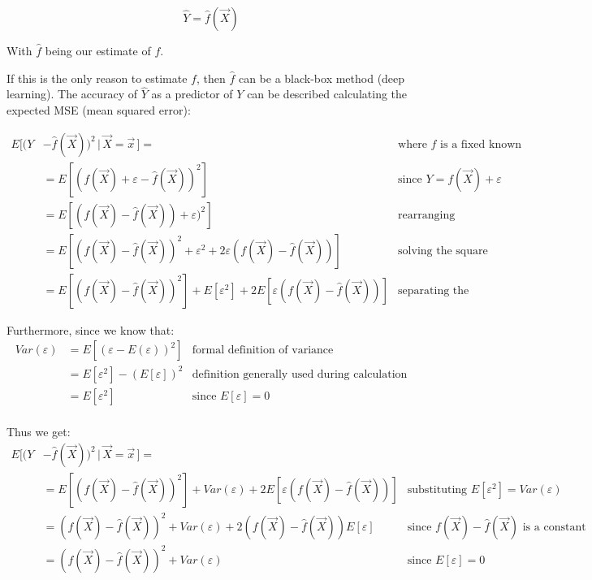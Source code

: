       $$\hat{Y} = \hat{f} (\vec{X})$$

      With $\hat{f}$ being our estimate of $f$.
      
      If this is the only reason to estimate $f$, then $\hat{f}$ can be a black-box method (deep learning).
      The accuracy of $\hat{Y}$ as a predictor of $Y$ can be described calculating the expected MSE (mean squared error):

      \begin{align*}
        E[(Y&-\hat{f}(\vec{X}))^2 \,|\, \vec{X} = \vec{x}\,] = 
        & \text{where } \hat{f} \text{ is a fixed known function}\\
        & = E[(f(\vec{X}) + \varepsilon - \hat{f}(\vec{X}))^2]
        & \text{since } Y = f(\vec{X}) + \varepsilon \\
        & = E[(f(\vec{X}) - \hat{f}(\vec{X})) + \varepsilon)^2]
        & \text{rearranging} \\
        & = E[(f(\vec{X}) - \hat{f}(\vec{X}))^2 + \varepsilon^2 + 2\varepsilon(f(\vec{X}) - \hat{f}(\vec{X}))]
        & \text{solving the square} \\
        & = E[(f(\vec{X}) - \hat{f}(\vec{X}))^2] + E[\varepsilon^2] + 2E[\varepsilon(f(\vec{X}) - \hat{f}(\vec{X}))]
        & \text{separating the expectations}
      \end{align*}
      
      Furthermore, since we know that:
      \begin{align*}
        Var(\varepsilon) 
        & = E[(\varepsilon - E(\varepsilon))^2]
        & \text{formal definition of variance} \\
        & = E[\varepsilon^2] - (E[\varepsilon])^2  
        & \text{definition generally used during calculation} \\
        & = E[\varepsilon^2] 
        & \text{since } E[\varepsilon] = 0 \\
      \end{align*}

      Thus we get:
      \begin{align*}
        E[(Y&-\hat{f}(\vec{X}))^2 \,|\, \vec{X} = \vec{x}\,] = \\
        & = E[(f(\vec{X}) - \hat{f}(\vec{X}))^2] + Var(\varepsilon) + 2E[\varepsilon(f(\vec{X}) - \hat{f}(\vec{X}))]
        & \text{substituting } E[\varepsilon^2] = Var(\varepsilon) \\
        & = (f(\vec{X}) - \hat{f}(\vec{X}))^2 + Var(\varepsilon) + 2(f(\vec{X}) - \hat{f}(\vec{X}))E[\varepsilon]
        & \text{since } f(\vec{X}) - \hat{f}(\vec{X}) \text{ is a constant}\\
        & = (f(\vec{X}) - \hat{f}(\vec{X}))^2 + Var(\varepsilon)
        & \text{since } E[\varepsilon] = 0 \\
      \end{align*}

